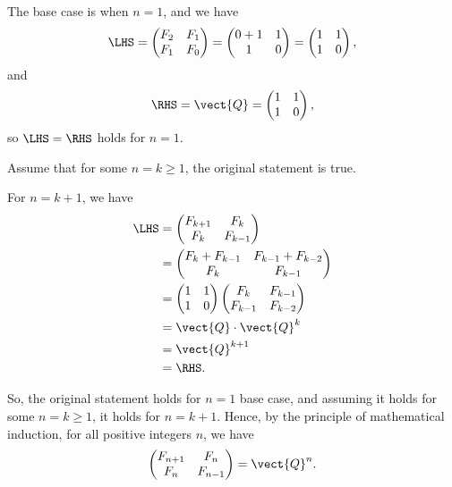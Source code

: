 \Question{\currfilebase}

The base case is when \(n = 1\), and we have
\[
    \LHS = \begin{pmatrix}
        F_2 & F_1 \\ F_1 & F_0
    \end{pmatrix} = \begin{pmatrix}
        0 + 1 & 1 \\ 1 & 0
    \end{pmatrix} = \begin{pmatrix}
        1 & 1 \\ 1 & 0
    \end{pmatrix},
\]
and
\[
    \RHS = \vect{Q} = \begin{pmatrix}
        1 & 1 \\ 1 & 0
    \end{pmatrix},
\]
so \(\LHS = \RHS\) holds for \(n = 1\).

Assume that for some \(n = k \geq 1\), the original statement is true.

For \(n = k + 1\), we have
\begin{align*}
    \LHS & = \begin{pmatrix}
                 F_{k + 1} & F_k \\ F_k & F_{k - 1}
             \end{pmatrix}       \\
         & = \begin{pmatrix}
                 F_k + F_{k - 1} & F_{k - 1} + F_{k - 2} \\
                 F_{k}           & F_{k - 1}
             \end{pmatrix} \\
         & = \begin{pmatrix}
                 1 & 1 \\ 1 & 0
             \end{pmatrix}
    \begin{pmatrix}
        F_{k} & F_{k - 1} \\ F_{k - 1} & F_{k - 2}
    \end{pmatrix}        \\
         & = \vect{Q} \cdot \vect{Q}^k               \\
         & = \vect{Q}^{k + 1}                        \\
         & = \RHS.
\end{align*}

So, the original statement holds for \(n = 1\) base case, and assuming it holds for some \(n = k \geq 1\), it holds for \(n = k + 1\). Hence, by the principle of mathematical induction, for all positive integers \(n\), we have
\[
    \begin{pmatrix}
        F_{n + 1} & F_n \\ F_n & F_{n - 1}
    \end{pmatrix} = \vect{Q}^n.
\]


